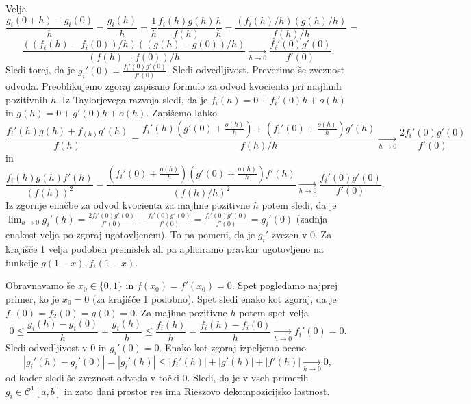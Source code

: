 \documentclass[a4paper, 12pt]{article}
\begin{document}
Velja
$$
\frac{g_i(0+h)-g_i(0) }{h} = \frac{g_i(h)}{h} = \frac{1}{h} \frac{f_i(h) g(h)}{f(h)}\frac{h}{h} = \frac{(f_i(h)/h)(g(h)/h)}{f(h)/h}=
$$
$$
\frac{((f_i(h)-f_i(0))/h)((g(h)-g(0))/h)}{(f(h)-f(0))/h}\xrightarrow[h\rightarrow 0]{} \frac{f_i'(0) g'(0)}{f'(0)}.
$$
Sledi torej, da je $g_i'(0) = \frac{f_i'(0) g'(0)}{f'(0)}$. Sledi odvedljivost. Preverimo še zveznost odvoda. Preoblikujemo zgoraj zapisano formulo za odvod kvocienta pri majhnih pozitivnih $h$. Iz Taylorjevega razvoja sledi, da je $f_i(h) = 0 + f_i'(0) h + o(h)$ in $g(h) = 0 + g'(0)h+o(h)$. Zapišemo lahko 
$$
\frac{f_i'(h) g(h) + f_(h) g'(h)}{f(h)} = \frac{f_i'(h) (g'(0) + \frac{o(h)}{h})  +  (f_i'(0) + \frac{o(h)}{h} )g'(h)}{f(h) / h}\xrightarrow[h\rightarrow 0]{} \frac{ 2f_i'(0)g'(0)}{f'(0)}
$$
in
$$
\frac{f_i(h)g(h) f'(h)}{(f(h))^2} = \frac{(f_i'(0) + \frac{o(h)}{h}) (g'(0) + \frac{o(h)}{h})f'(h) }{(f(h)/h)^2} \xrightarrow[h\rightarrow 0]{} \frac{f_i'(0)g'(0)}{f'(0)}.
$$
Iz zgornje enačbe za odvod kvocienta za majhne pozitivne $h$ potem sledi, da je $\lim_{h\rightarrow 0}g_i'(h) = \frac{ 2f_i'(0)g'(0)}{f'(0)} - \frac{f_i'(0)g'(0)}{f'(0)} = \frac{f_i'(0)g'(0)}{f'(0)} = g_i'(0)$ (zadnja enakost velja po zgoraj ugotovljenem). To pa pomeni, da je $g_i'$ zvezen v 0. Za krajišče 1 velja podoben premislek ali pa apliciramo pravkar ugotovljeno na funkcije $g(1-x), f_i(1-x)$.

Obravnavamo še $x_0\in \{0,1\} $ in $f(x_0) = f'(x_0) = 0$. Spet pogledamo najprej primer, ko je $x_0 = 0$ (za krajišče 1 podobno). Spet sledi enako kot zgoraj, da je $f_1(0) = f_2(0) = g(0) = 0$. Za majhne pozitivne $h$ potem spet velja
$$
0 \le \frac{g_i(h) - g_i(0)}{h} = \frac{g_i(h)}{h}\le \frac{f_i(h)}{h} = \frac{f_i(h) - f_i(0)}{h} \xrightarrow[h\rightarrow 0]{} f_i'(0) = 0.
$$
Sledi odvedljivost v 0 in $g_i'(0) = 0$. 
Enako kot zgoraj izpeljemo oceno
$$
|g_i'(h) - g_i'(0)| = |g_i'(h)| \le |f_i'(h) | + |g'(h)| + |f'(h)| \xrightarrow[h\rightarrow 0]{} 0,
$$
od koder sledi še zveznost odvoda v točki 0. Sledi, da je v vseh primerih $g_i \in \mathcal{C}^1[a,b]$ in zato dani prostor res ima Rieszovo dekompozicijsko lastnost.
\end{document}
